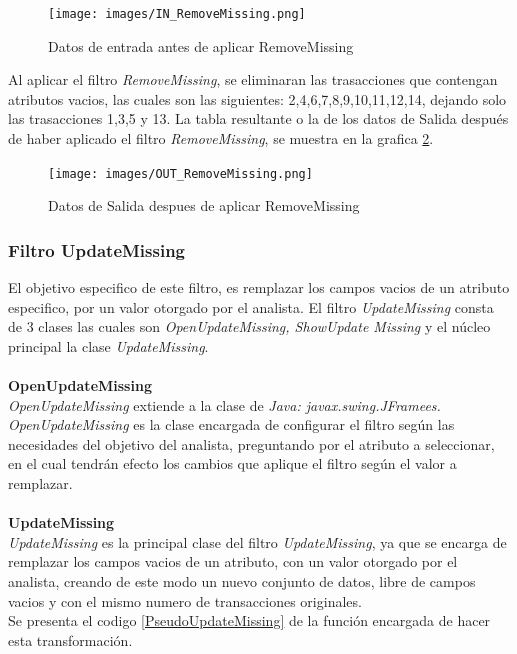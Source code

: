 \begin{figure}[h]
\centering
\texttt{[image: images/IN\_RemoveMissing.png]}
\caption{Datos de entrada antes de aplicar RemoveMissing}
\label{IN_RemoveMissing}
\end{figure}

Al aplicar el filtro \textit{RemoveMissing}, se eliminaran las trasacciones que contengan atributos vacios, las cuales son las siguientes:  2,4,6,7,8,9,10,11,12,14, dejando solo las trasacciones 1,3,5 y 13. 
La tabla resultante o la de los datos de Salida despu\'es de haber aplicado el filtro \textit{RemoveMissing}, se muestra en la grafica \ref{OUT_RemoveMissing}.\\

\begin{figure}[h]
\centering
\texttt{[image: images/OUT\_RemoveMissing.png]}
\caption{Datos de Salida despues de aplicar RemoveMissing}
\label{OUT_RemoveMissing}
\end{figure}

\subsubsection{Filtro UpdateMissing}
El objetivo especifico de este filtro, es remplazar los campos vacios de un atributo especifico, por un valor otorgado por el analista.
El filtro \textit{UpdateMissing} consta de 3 clases las cuales son \textit{OpenUpdateMissing, ShowUpdate Missing} y el n\'ucleo principal la clase \textit{UpdateMissing}.\\ \\ 
\textbf{OpenUpdateMissing} \\ 
\textit{OpenUpdateMissing} extiende a la clase de \textit{Java: javax.swing.JFramees. OpenUpdateMissing} es la clase encargada de configurar el filtro seg\'un las necesidades del objetivo del analista, preguntando por el atributo a seleccionar, en el cual tendr\'an efecto los cambios que aplique el filtro seg\'un el valor a remplazar. \\ \\
\textbf{UpdateMissing} \\
\textit{UpdateMissing} es la principal clase del filtro \textit{UpdateMissing}, ya que se encarga de remplazar los campos vacios de un atributo, con un valor otorgado por el analista, creando de este modo un nuevo conjunto de datos, libre de campos vacios y con el mismo numero de transacciones originales. \\
Se presenta el codigo \ref{PseudoUpdateMissing} de la funci\'on encargada de hacer  esta transformaci\'on. \\ 

